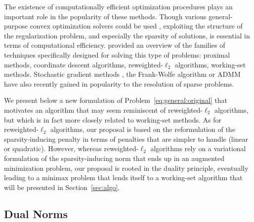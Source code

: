 The existence of computationally efficient optimization procedures plays an
important role in the popularity of these methods.
Though various general-purpose convex optimization solvers could be used
\citep{boyd2004convex}, exploiting the structure of the regularization problem,
and especially the sparsity of solutions, is essential in terms of computational
efficiency.
%
\citet{2012_FML_Bach} provided an overview of the families of techniques 
specifically  designed for solving this type of problems:
proximal methods, coordinate descent algorithms, reweighted-$\ell_{2}$
algorithms, working-set methods.
Stochastic gradient methods \citep{moulines2011non}, the
Frank-Wolfe algorithm \citep{lacoste2012block} or ADMM \citep[Alternating Direction
Method of Multipliers,][]{boyd2011distributed} have also recently gained in
popularity to the resolution of sparse problems.

We present below a new formulation of Problem~\eqref{eq:general:original} that
motivates an algorithm that may seem reminiscent of reweighted-$\ell_{2}$
algorithms, but which is in fact more closely related to working-set methods.
%
As for reweighted-$\ell_{2}$ algorithms, our proposal is based on the
reformulation of the sparsity-inducing penalty in terms of penalties that are
simpler to handle (linear or quadratic).  However, whereas
reweighted-$\ell_{2}$ algorithms rely on a
variational formulation of the sparsity-inducing norm that ends up in an
augmented minimization problem, our proposal is rooted in the duality principle,
eventually leading to a minimax problem that lends itself to a working-set 
algorithm that will be presented in Section~\ref{sec:algo}.

\subsection{Dual Norms}

